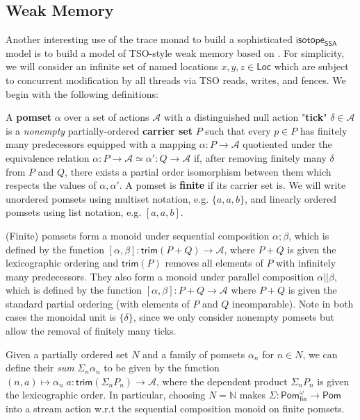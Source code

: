 \documentclass[acmsmall,screen,review]{acmart}
\newcommand{\mc}[1]{\ensuremath{\mathcal{#1}}}
\newcommand{\ms}[1]{\ensuremath{\mathsf{#1}}}
\newcommand{\nats}{\mathbb{N}}
\newcommand{\isotopessa}{\ms{isotope_{SSA}}}
\begin{document}
\subsection{Weak Memory}

Another interesting use of the trace monad to build a sophisticated \isotopessa
model is to build a model of TSO-style weak memory based on \citet{sparky}. For
simplicity, we will consider an infinite set of named locations \(x, y, z \in
\ms{Loc}\) which are subject to concurrent modification by all threads via TSO
reads, writes, and fences. We begin with the following definitions:
\begin{definition}[Pomset] 
  A \textbf{pomset} \(\alpha\) over a set of actions \(\mc{A}\) with a
  distinguished null action "\textbf{tick}" \(\delta \in \mc{A}\) is a
  \textit{nonempty} partially-ordered \textbf{carrier set} \(P\) such that every
  \(p \in P\) has finitely many predecessors equipped with a mapping \(\alpha: P
  \to \mc{A}\) quotiented under the equivalence relation \(\alpha: P \to \mc{A}
  \simeq \alpha': Q \to \mc{A}\) if, after removing finitely many \(\delta\)
  from \(P\) and \(Q\), there exists a partial order isomorphism between them
  which respects the values of \(\alpha, \alpha'\). A pomset is \textbf{finite}
  if its carrier set is. We will write unordered pomsets using multiset
  notation, e.g. \(\{a, a, b\}\), and linearly ordered pomsets using list
  notation, e.g. \([a, a, b]\).
\end{definition}
(Finite) pomsets form a monoid under sequential composition \(\alpha;\beta\),
which is defined by the function \([\alpha, \beta]: \ms{trim}(P + Q) \to
\mc{A}\), where \(P + Q\) is given the lexicographic ordering and
\(\ms{trim}(P)\) removes all elements of \(P\) with infinitely many
predecessors. They also form a monoid under parallel composition \(\alpha ||
\beta\), which is defined by the function \([\alpha, \beta]: P + Q \to \mc{A}\)
where \(P + Q\) is given the standard partial ordering (with elements of \(P\)
and \(Q\) incomparable). Note in both cases the monoidal unit is \(\{\delta\}\),
since we only consider nonempty pomsets but allow the removal of finitely many
ticks.

Given a partially ordered set \(N\) and a family of pomsets \(\alpha_n\) for \(n
\in N\), we can define their \textit{sum} \(\Sigma_n\alpha_n\) to be given by
the function \((n, a) \mapsto \alpha_n\;a: \ms{trim}(\Sigma_nP_n) \to \mc{A}\),
where the dependent product \(\Sigma_nP_n\) is given the lexicographic order. In
particular, choosing \(N = \nats\) makes \(\Sigma: \ms{Pom}_{\ms{fin}}^\omega
\to \ms{Pom}\) into a stream action w.r.t the sequential composition monoid on
finite pomsets. 
\end{document}
